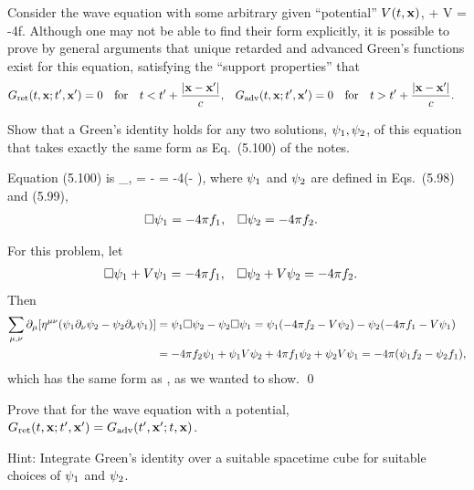 \begin{statement}{}
	Consider the wave equation with some arbitrary given ``potential'' $V(t, \vb{x})$,
	\beq
		\Box \psi + V \psi = -4\pi f.
	\eeq
	Although one may not be able to find their form explicitly, it is possible to prove by general arguments that unique retarded and advanced Green's functions exist for this equation, satisfying the ``support properties'' that
	\begin{align*}
		\Grettx = 0 &\qfor t < t' + \frac{\abs{\vx - \vx'}}{c}, &
		\Gadv(t, \vx; t', \vx') = 0 &\qfor t > t' + \frac{\abs{\vx - \vx'}}{c}.
	\end{align*}
	\vfix
\end{statement}

\begin{problem} \label{3.a}
	Show that a Green's identity holds for any two solutions, $\psi_1, \psi_2$, of this equation that takes exactly the same form as Eq.~(5.100) of the notes.
\end{problem}

\begin{solution}
	Equation (5.100) is
	\beqn \label{100}
		\sum_{\mu, \nu} \dmu [\etamunu (\psiq \dnu \psiw - \psiw \dnu \psiq)] = \psiq \Box \psiw - \psiw \Box \psiq
		= -4\pi (\psiq \fw - \psiw \fq),
	\eeqn
	where $\psi_1$ and $\psi_2$ are defined in Eqs.~(5.98) and (5.99),
	\begin{align*}
		\Box \psi_1 &= -4\pi f_1, &
		\Box \psi_2 &= -4\pi f_2.
	\end{align*}
	
	For this problem, let
	\begin{align} \label{psis}
		\Box \psi_1 + V \psi_1 &= -4\pi f_1, &
		\Box \psi_2 + V \psi_2 &= -4\pi f_2.
	\end{align}
	Then 
	\begin{align*}
		\sum_{\mu, \nu} \partial_\mu [\eta^{\mu \nu} (\psi_1 \partial_\nu \psi_2 - \psi_2 \partial_\nu \psi_1)] &= \psi_1 \Box \psi_2 - \psi_2 \Box \psi_1
		= \psi_1 (-4\pi f_2 - V \psi_2) - \psi_2 (-4\pi f_1 - V \psi_1) \\
		&= -4\pi f_2 \psi_1 + \psi_1 V \psi_2 + 4\pi f_1 \psi_2 + \psi_2 V \psi_1
		= -4\pi (\psi_1 f_2 - \psi_2 f_1),
	\end{align*}
	which has the same form as , as we wanted to show. \qed
\end{solution}



\begin{problem}
	Prove that for the wave equation with a potential, $G_{\text{ret}}(t, \vb{x}; t', \vb{x}') = G_{\text{adv}}(t', \vb{x}'; t, \vb{x})$.
	
	Hint: Integrate Green's identity over a suitable spacetime cube for suitable choices of $\psi_1$ and $\psi_2$.
\end{problem}

